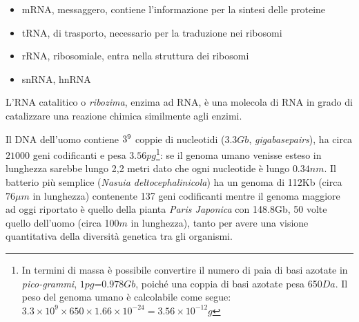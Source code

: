 \begin{itemize}
	\item mRNA, messaggero, contiene l'informazione per la sintesi delle proteine
	\item tRNA, di trasporto, necessario per la traduzione nei ribosomi
	\item rRNA, ribosomiale, entra nella struttura dei ribosomi
	\item snRNA, hnRNA
\end{itemize}

L'RNA catalitico o \textit{ribozima}, enzima ad RNA, è una molecola di RNA in grado di catalizzare una reazione chimica similmente agli enzimi. \\

\par Il DNA dell'uomo contiene $3\time10^{9}$ coppie di nucleotidi ($3.3Gb$, \textit{gigabasepairs}), ha circa $21000$ geni codificanti e pesa $3.56pg$\footnote{In termini di massa è possibile convertire il numero di paia di basi azotate in \textit{pico-grammi}, $1pg$=$0.978Gb$, poiché una coppia di basi azotate pesa 650$Da$. Il peso del genoma umano è calcolabile come segue: $3.3\times10^{9}\times650\times1.66\times10^{-24}=3.56\times10^{-12}g$}: se il genoma umano venisse esteso in lunghezza sarebbe lungo 2,2 metri dato che ogni nucleotide è lungo $0.34nm$. Il batterio più semplice (\textit{Nasuia deltocephalinicola}) ha un genoma di 112Kb\supercite{nasuiaWiki} (circa $76\mu m$ in lunghezza) contenente 137 geni codificanti mentre il genoma maggiore ad oggi riportato è quello della pianta \textit{Paris Japonica} con 148.8Gb\supercite{hidalgo2017there}, 50 volte quello dell'uomo (circa 100$m$ in lunghezza), tanto per avere una visione quantitativa della diversità genetica tra gli organismi.

